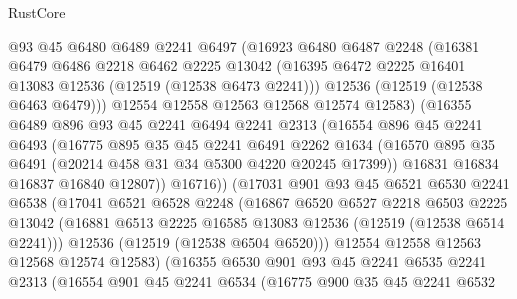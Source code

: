 \begin{lexlean}{RustCore}
\begin{coremodule}
              @93
              @45
              @6480
              @6489
              @2241
              @6497
              (@16923
                @6480
                @6487
                @2248
                (@16381
                  @6479
                  @6486
                  @2218
                  @6462
                  @2225
                  @13042
                  (@16395 @6472 @2225 @16401 @13083 @12536 (@12519 (@12538 @6473 @2241)))
                  @12536
                  (@12519 (@12538 @6463 @6479)))
                @12554
                @12558
                @12563
                @12568
                @12574
                @12583)
              (@16355
                @6489
                @896
                @93
                @45
                @2241
                @6494
                @2241
                @2313
                (@16554
                  @896
                  @45
                  @2241
                  @6493
                  (@16775
                    @895
                    @35
                    @45
                    @2241
                    @6491
                    @2262
                    @1634
                    (@16570 @895 @35 @6491 (@20214 @458 @31 @34 @5300 @4220 @20245 @17399))
                    @16831
                    @16834
                    @16837
                    @16840
                    @12807))
                @16716))
            (@17031
              @901
              @93
              @45
              @6521
              @6530
              @2241
              @6538
              (@17041
                @6521
                @6528
                @2248
                (@16867
                  @6520
                  @6527
                  @2218
                  @6503
                  @2225
                  @13042
                  (@16881 @6513 @2225 @16585 @13083 @12536 (@12519 (@12538 @6514 @2241)))
                  @12536
                  (@12519 (@12538 @6504 @6520)))
                @12554
                @12558
                @12563
                @12568
                @12574
                @12583)
              (@16355
                @6530
                @901
                @93
                @45
                @2241
                @6535
                @2241
                @2313
                (@16554
                  @901
                  @45
                  @2241
                  @6534
                  (@16775
                    @900
                    @35
                    @45
                    @2241
                    @6532

\end{coremodule}
\end{lexlean}
